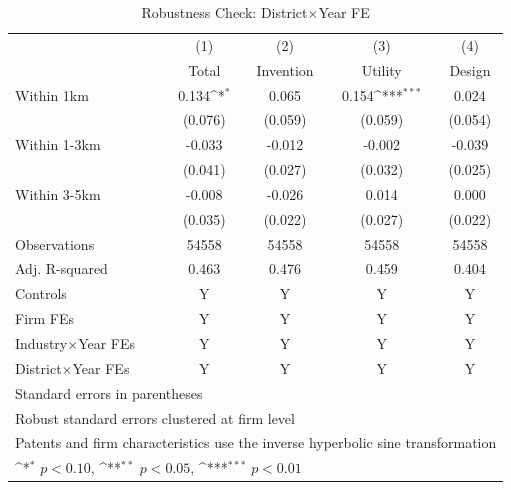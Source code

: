 \begin{table}[!htbp]\centering
\def\sym#1{\ifmmode^{#1}\else\(^{#1}\)\fi}
\caption{Robustness Check: District$\times$Year FE}
\label{tab:RBdistrict}
\begin{tabular}{l*{4}{c}}
\toprule
            &\multicolumn{1}{c}{(1)}&\multicolumn{1}{c}{(2)}&\multicolumn{1}{c}{(3)}&\multicolumn{1}{c}{(4)}\\
            &\multicolumn{1}{c}{Total}&\multicolumn{1}{c}{Invention}&\multicolumn{1}{c}{Utility}&\multicolumn{1}{c}{Design}\\
\midrule
Within 1km  &       0.134\sym{*}  &       0.065         &       0.154\sym{***}&       0.024         \\
            &     (0.076)         &     (0.059)         &     (0.059)         &     (0.054)         \\
\addlinespace
Within 1-3km&      -0.033         &      -0.012         &      -0.002         &      -0.039         \\
            &     (0.041)         &     (0.027)         &     (0.032)         &     (0.025)         \\
\addlinespace
Within 3-5km&      -0.008         &      -0.026         &       0.014         &       0.000         \\
            &     (0.035)         &     (0.022)         &     (0.027)         &     (0.022)         \\
\midrule
Observations&       54558         &       54558         &       54558         &       54558         \\
Adj. R-squared&       0.463         &       0.476         &       0.459         &       0.404         \\
Controls    &           Y         &           Y         &           Y         &           Y         \\
Firm FEs    &           Y         &           Y         &           Y         &           Y         \\
Industry$\times$Year FEs&           Y         &           Y         &           Y         &           Y         \\
District$\times$Year FEs&           Y         &           Y         &           Y         &           Y         \\
\bottomrule
\multicolumn{5}{l}{\footnotesize Standard errors in parentheses}\\
\multicolumn{5}{l}{\footnotesize Robust standard errors clustered at firm level}\\
\multicolumn{5}{l}{\footnotesize Patents and firm characteristics use the inverse hyperbolic sine transformation}\\
\multicolumn{5}{l}{\footnotesize \sym{*} \(p<0.10\), \sym{**} \(p<0.05\), \sym{***} \(p<0.01\)}\\
\end{tabular}
\end{table}